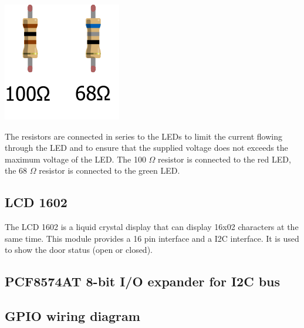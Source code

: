 \documentclass[]{article}
\begin{document}
\begin{center}
    \includegraphics{resistors}
\end{center}
The resistors are connected in series to the LEDs to limit the current flowing through the LED and to ensure that the supplied 
voltage does not exceeds the maximum voltage of the LED. The 100 $ \Omega $ resistor is connected to the red LED, the 68 $ \Omega $ 
resistor is connected to the green LED.

\subsection{LCD 1602}
The LCD 1602 is a liquid crystal display that can display 16x02 characters at the same time. 
This module provides a 16 pin interface and a I2C interface. 
It is used to show the door status (open or closed).

\subsection{PCF8574AT 8-bit I/O expander for I2C bus}

\subsection{GPIO wiring diagram}
\end{document}

